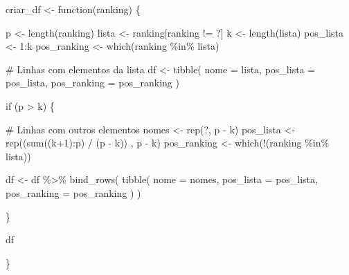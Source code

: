 \documentclass[
  letterpaper,
  DIV=11,
  numbers=noendperiod]{scrreprt}
\newenvironment{Shaded}{\begin{snugshade}}{\end{snugshade}}
\newcommand{\AttributeTok}[1]{\textcolor[rgb]{0.40,0.45,0.13}{#1}}
\newcommand{\CommentTok}[1]{\textcolor[rgb]{0.37,0.37,0.37}{#1}}
\newcommand{\ControlFlowTok}[1]{\textcolor[rgb]{0.00,0.23,0.31}{#1}}
\newcommand{\DecValTok}[1]{\textcolor[rgb]{0.68,0.00,0.00}{#1}}
\newcommand{\FunctionTok}[1]{\textcolor[rgb]{0.28,0.35,0.67}{#1}}
\newcommand{\NormalTok}[1]{\textcolor[rgb]{0.00,0.23,0.31}{#1}}
\newcommand{\OtherTok}[1]{\textcolor[rgb]{0.00,0.23,0.31}{#1}}
\newcommand{\SpecialCharTok}[1]{\textcolor[rgb]{0.37,0.37,0.37}{#1}}
\newcommand{\StringTok}[1]{\textcolor[rgb]{0.13,0.47,0.30}{#1}}
\begin{document}
\begin{Shaded}
\begin{Highlighting}[]
\NormalTok{criar\_df }\OtherTok{\textless{}{-}} \ControlFlowTok{function}\NormalTok{(ranking) \{}
  
\NormalTok{  p }\OtherTok{\textless{}{-}} \FunctionTok{length}\NormalTok{(ranking)}
\NormalTok{  lista }\OtherTok{\textless{}{-}}\NormalTok{ ranking[ranking }\SpecialCharTok{!=} \StringTok{\textquotesingle{}?\textquotesingle{}}\NormalTok{]}
\NormalTok{  k }\OtherTok{\textless{}{-}} \FunctionTok{length}\NormalTok{(lista)}
\NormalTok{  pos\_lista }\OtherTok{\textless{}{-}} \DecValTok{1}\SpecialCharTok{:}\NormalTok{k}
\NormalTok{  pos\_ranking }\OtherTok{\textless{}{-}} \FunctionTok{which}\NormalTok{(ranking }\SpecialCharTok{\%in\%}\NormalTok{ lista)}
  
  \CommentTok{\# Linhas com elementos da lista}
\NormalTok{  df }\OtherTok{\textless{}{-}} \FunctionTok{tibble}\NormalTok{(}
    \AttributeTok{nome =}\NormalTok{ lista,}
    \AttributeTok{pos\_lista =}\NormalTok{ pos\_lista,}
    \AttributeTok{pos\_ranking =}\NormalTok{ pos\_ranking}
\NormalTok{  )}
  
  \ControlFlowTok{if}\NormalTok{ (p }\SpecialCharTok{\textgreater{}}\NormalTok{ k) \{}
    
    \CommentTok{\# Linhas com outros elementos}
\NormalTok{    nomes }\OtherTok{\textless{}{-}} \FunctionTok{rep}\NormalTok{(}\StringTok{\textquotesingle{}?\textquotesingle{}}\NormalTok{, p }\SpecialCharTok{{-}}\NormalTok{ k)}
\NormalTok{    pos\_lista }\OtherTok{\textless{}{-}} \FunctionTok{rep}\NormalTok{((}\FunctionTok{sum}\NormalTok{((k}\SpecialCharTok{+}\DecValTok{1}\NormalTok{)}\SpecialCharTok{:}\NormalTok{p) }\SpecialCharTok{/}\NormalTok{ (p }\SpecialCharTok{{-}}\NormalTok{ k)) , p }\SpecialCharTok{{-}}\NormalTok{ k)}
\NormalTok{    pos\_ranking }\OtherTok{\textless{}{-}} \FunctionTok{which}\NormalTok{(}\SpecialCharTok{!}\NormalTok{(ranking }\SpecialCharTok{\%in\%}\NormalTok{ lista))}
    
\NormalTok{    df }\OtherTok{\textless{}{-}}\NormalTok{ df }\SpecialCharTok{\%\textgreater{}\%} 
      \FunctionTok{bind\_rows}\NormalTok{(}
        \FunctionTok{tibble}\NormalTok{(}
          \AttributeTok{nome =}\NormalTok{ nomes,}
          \AttributeTok{pos\_lista =}\NormalTok{ pos\_lista,}
          \AttributeTok{pos\_ranking =}\NormalTok{ pos\_ranking}
\NormalTok{        )}
\NormalTok{      )}
      
\NormalTok{  \}}
  
\NormalTok{  df}
  
\NormalTok{\}}
\end{Highlighting}
\end{Shaded}
\end{document}
